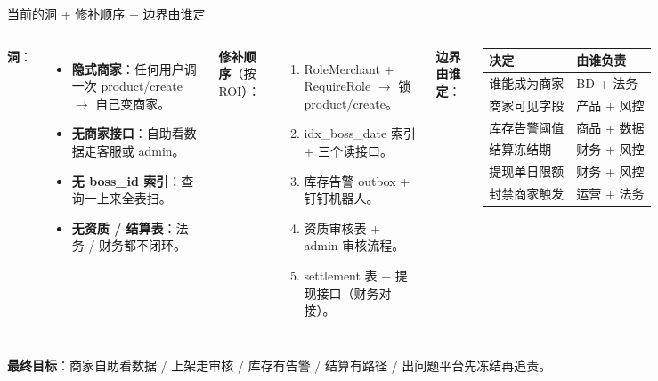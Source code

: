 \begin{frame}{当前的洞 + 修补顺序 + 边界由谁定}
\begin{columns}[T,onlytextwidth]
\textbf{洞}：
\begin{itemize}\setlength{\itemsep}{0.5mm}
  \item \textbf{隐式商家}：任何用户调一次 product/create $\to$ 自己变商家。
  \item \textbf{无商家接口}：自助看数据走客服或 admin。
  \item \textbf{无 boss\_id 索引}：查询一上来全表扫。
  \item \textbf{无资质 / 结算表}：法务 / 财务都不闭环。
\end{itemize}
\textbf{修补顺序}（按 ROI）：
\begin{enumerate}\setlength{\itemsep}{0.5mm}
  \item RoleMerchant + RequireRole $\to$ 锁 product/create。
  \item idx\_boss\_date 索引 + 三个读接口。
  \item 库存告警 outbox + 钉钉机器人。
  \item 资质审核表 + admin 审核流程。
  \item settlement 表 + 提现接口（财务对接）。
\end{enumerate}
\scriptsize
\textbf{边界由谁定}：
\begin{tabular}{@{}ll@{}}
\toprule
决定 & 由谁负责 \\
\midrule
谁能成为商家     & BD + 法务 \\
商家可见字段     & 产品 + 风控 \\
库存告警阈值     & 商品 + 数据 \\
结算冻结期       & 财务 + 风控 \\
提现单日限额     & 财务 + 风控 \\
封禁商家触发     & 运营 + 法务 \\
\bottomrule
\end{tabular}
\end{columns}
\vspace{1mm}
\small \textbf{最终目标}：商家自助看数据 / 上架走审核 / 库存有告警 / 结算有路径 / 出问题平台先冻结再追责。
\end{frame}

\appendix

